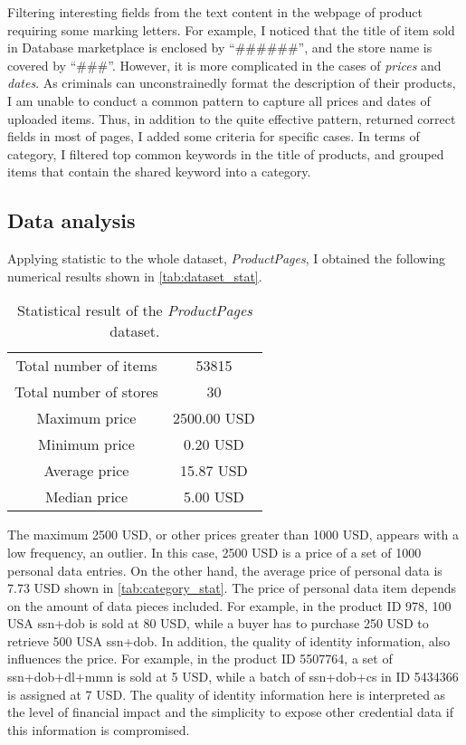 Filtering interesting fields from the text content in the webpage of product requiring
some marking letters. For example, I noticed that the title of item sold in Database
marketplace is enclosed by ``\#\#\#\#\#\#'', and the store name is covered by ``\#\#\#''. However,
it is more complicated in the cases of \emph{prices} and \emph{dates}. As criminals can
unconstrainedly format the description of their products, I am unable to conduct a common
pattern to capture all prices and dates of uploaded items. Thus, in addition to the quite
effective pattern, returned correct fields in most of pages, I added some criteria for
specific cases. In terms of category, I filtered top common keywords in the title of
products, and grouped items that contain the shared keyword into a category.

\subsection{Data analysis}
%
Applying statistic to the whole dataset, \emph{ProductPages}, I obtained the following
numerical results shown in \autoref{tab:dataset_stat}.

\begin{table}
    \centering
    \begin{tabular}{|c|c|}
        \hline
        Total number of items & 53815\\
        Total number of stores & 30\\
        Maximum price & 2500.00 USD\\
        Minimum price & 0.20 USD\\
        Average price & 15.87 USD\\
        Median price & 5.00 USD\\
        \hline
    \end{tabular}
    \caption{Statistical result of the \emph{ProductPages} dataset.}
    \label{tab:dataset_stat}
\end{table}

The maximum 2500 USD, or other prices greater than 1000 USD, appears with a low
frequency, an outlier. In this case, 2500 USD is a price of a set of 1000 personal data
entries. On the other hand, the average price of personal data is 7.73 USD shown
in \autoref{tab:category_stat}. The price of personal data item depends on the amount
of data pieces included. For example, in the product ID 978, 100 USA \acrshort{ssn}+\acrshort{dob}
is sold at 80 USD, while a buyer has to purchase 250 USD to retrieve 500 USA \acrshort{ssn}+\acrshort{dob}.
In addition, the quality of identity information, also influences
the price. For example, in the product ID 5507764, a set of \acrshort{ssn}+\acrshort{dob}+\acrshort{dl}+\acrshort{mmn}
is sold at 5 USD, while a batch of \acrshort{ssn}+\acrshort{dob}+\acrshort{cs} in ID 5434366 is
assigned at 7 USD\@. The quality of identity information here is interpreted as the level
of financial impact and the simplicity to expose other credential data if this
information is compromised.

